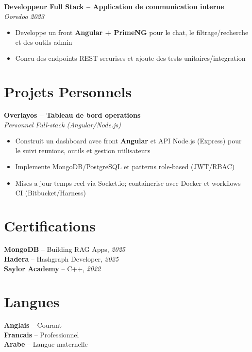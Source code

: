 \documentclass[10pt,a4paper]{article}
\begin{document}
{\vspace{3pt}
\textbf{Developpeur Full Stack -- Application de communication interne}\\[1pt]
\textit{Ooredoo} \hfill \textit{2023}
\begin{itemize}
  \item Developpe un front \textbf{Angular + PrimeNG} pour le chat, le filtrage/recherche et des outils admin
  \item Concu des endpoints REST securises et ajoute des tests unitaires/integration
\end{itemize}

}

\vspace{4pt}
\section*{Projets Personnels}
{\small
\textbf{Overlayos -- Tableau de bord operations}\\[1pt]
\textit{Personnel} \hfill \textit{Full-stack (Angular/Node.js)}
\begin{itemize}
  \item Construit un dashboard avec front \textbf{Angular} et API Node.js (Express) pour le suivi reunions, outils et gestion utilisateurs
  \item Implemente MongoDB/PostgreSQL et patterns role-based (JWT/RBAC)
  \item Mises a jour temps reel via Socket.io; containerise avec Docker et workflows CI (Bitbucket/Harness)
\end{itemize}

}

\vspace{3pt}
\section*{Certifications}
{\small
\textbf{MongoDB} -- Building RAG Apps, \textit{2025}\\[1pt]
\textbf{Hadera} -- Hashgraph Developer, \textit{2025}\\[1pt]
\textbf{Saylor Academy} -- C++, \textit{2022}
}

\section*{Langues}
{\small
\textbf{Anglais} -- Courant\\[1pt]
\textbf{Francais} -- Professionnel\\[1pt]
\textbf{Arabe} -- Langue maternelle
}
\end{document}
